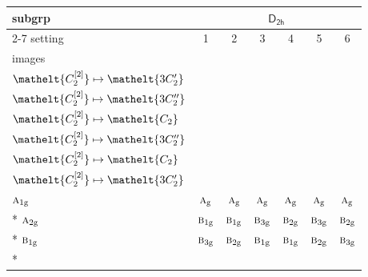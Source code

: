\documentclass[10pt,a4paper]{article}
\numberwithin{equation}{section}
\newcommand{\eltfont}[1]{{\let\sigma\eltsigma\mathelt{#1}}}
\newcommand{\grp}[1]{\mathsf{#1}}
\newcommand{\irr}[1]{\text{\normalfont\scshape #1}}
\newcommand{\cls}[1]{\eltfont{#1}}
\newcommand{\ptag}[1]{\mathrm{#1}}
\newcommand{\genidx}[2]{#1^{[\mathrm{#2}]}}
\begin{document}
{\small\begin{longtable}{@{}lcccccc@{}}\toprule
subgrp & \multicolumn{6}{c}{\href{D2h.pdf}{$\grp{D_{2h}}$}}\\\cmidrule(lr){2-7}
setting & 1 & 2 & 3 & 4 & 5 & 6\\
images & {\scriptsize\begin{tabular}[t]{@{}c@{}}$\cls{\genidx{C_{2}}{1}} \mapsto \cls{C_{2}}$\\$\cls{\genidx{C_{2}}{2}} \mapsto \cls{3C_{2}'}$\end{tabular}} & {\scriptsize\begin{tabular}[t]{@{}c@{}}$\cls{\genidx{C_{2}}{1}} \mapsto \cls{C_{2}}$\\$\cls{\genidx{C_{2}}{2}} \mapsto \cls{3C_{2}''}$\end{tabular}} & {\scriptsize\begin{tabular}[t]{@{}c@{}}$\cls{\genidx{C_{2}}{1}} \mapsto \cls{3C_{2}'}$\\$\cls{\genidx{C_{2}}{2}} \mapsto \cls{C_{2}}$\end{tabular}} & {\scriptsize\begin{tabular}[t]{@{}c@{}}$\cls{\genidx{C_{2}}{1}} \mapsto \cls{3C_{2}'}$\\$\cls{\genidx{C_{2}}{2}} \mapsto \cls{3C_{2}''}$\end{tabular}} & {\scriptsize\begin{tabular}[t]{@{}c@{}}$\cls{\genidx{C_{2}}{1}} \mapsto \cls{3C_{2}''}$\\$\cls{\genidx{C_{2}}{2}} \mapsto \cls{C_{2}}$\end{tabular}} & {\scriptsize\begin{tabular}[t]{@{}c@{}}$\cls{\genidx{C_{2}}{1}} \mapsto \cls{3C_{2}''}$\\$\cls{\genidx{C_{2}}{2}} \mapsto \cls{3C_{2}'}$\end{tabular}}\\\midrule\endhead
\bottomrule\endfoot\endlastfoot
$\irr{a}_{1\ptag{g}}$ & $\irr{a}_{\ptag{g}}$ & $\irr{a}_{\ptag{g}}$ & $\irr{a}_{\ptag{g}}$ & $\irr{a}_{\ptag{g}}$ & $\irr{a}_{\ptag{g}}$ & $\irr{a}_{\ptag{g}}$\\*
$\irr{a}_{2\ptag{g}}$ & $\irr{b}_{1\ptag{g}}$ & $\irr{b}_{1\ptag{g}}$ & $\irr{b}_{3\ptag{g}}$ & $\irr{b}_{2\ptag{g}}$ & $\irr{b}_{3\ptag{g}}$ & $\irr{b}_{2\ptag{g}}$\\*
$\irr{b}_{1\ptag{g}}$ & $\irr{b}_{3\ptag{g}}$ & $\irr{b}_{2\ptag{g}}$ & $\irr{b}_{1\ptag{g}}$ & $\irr{b}_{1\ptag{g}}$ & $\irr{b}_{2\ptag{g}}$ & $\irr{b}_{3\ptag{g}}$\\*

\end{longtable}}
\end{document}
